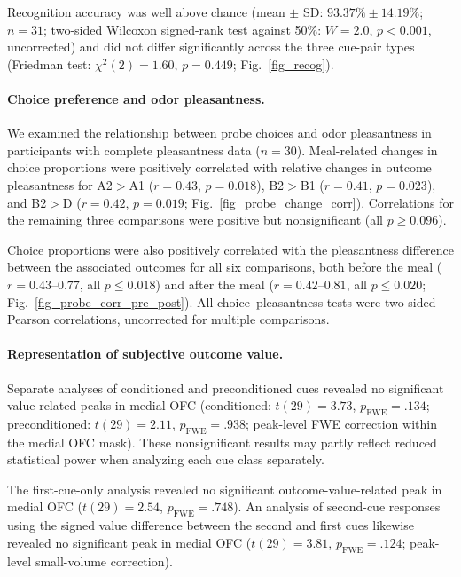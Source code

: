 \documentclass[12pt,letterpaper]{article}
\begin{document}
Recognition accuracy was well above chance (mean $\pm$ SD: $93.37\% \pm 14.19\%$; $n = 31$; two-sided Wilcoxon signed-rank test against 50\%: $W = 2.0$, $p < 0.001$, uncorrected) and did not differ significantly across the three cue-pair types (Friedman test: $\chi^2(2) = 1.60$, $p = 0.449$; Fig.~\ref{fig_recog}).

\paragraph*{Choice preference and odor pleasantness.}

We examined the relationship between probe choices and odor pleasantness in participants with complete pleasantness data ($n = 30$). Meal-related changes in choice proportions were positively correlated with relative changes in outcome pleasantness for A2$>$A1 ($r = 0.43$, $p = 0.018$), B2$>$B1 ($r = 0.41$, $p = 0.023$), and B2$>$D ($r = 0.42$, $p = 0.019$; Fig.~\ref{fig_probe_change_corr}). Correlations for the remaining three comparisons were positive but nonsignificant (all $p \geq 0.096$).

Choice proportions were also positively correlated with the pleasantness difference between the associated outcomes for all six comparisons, both before the meal ($r = 0.43$--$0.77$, all $p \leq 0.018$) and after the meal ($r = 0.42$--$0.81$, all $p \leq 0.020$; Fig.~\ref{fig_probe_corr_pre_post}). All choice--pleasantness tests were two-sided Pearson correlations, uncorrected for multiple comparisons.

\paragraph*{Representation of subjective outcome value.}

Separate analyses of conditioned and preconditioned cues revealed no significant value-related peaks in medial OFC (conditioned: $t(29)=3.73$, $p_{\mathrm{FWE}}=.134$; preconditioned: $t(29)=2.11$, $p_{\mathrm{FWE}}=.938$; peak-level FWE correction within the medial OFC mask). These nonsignificant results may partly reflect reduced statistical power when analyzing each cue class separately.

The first-cue-only analysis revealed no significant outcome-value-related peak in medial OFC ($t(29)=2.54$, $p_{\mathrm{FWE}}=.748$). An analysis of second-cue responses using the signed value difference between the second and first cues likewise revealed no significant peak in medial OFC ($t(29)=3.81$, $p_{\mathrm{FWE}}=.124$; peak-level small-volume correction).
\end{document}
